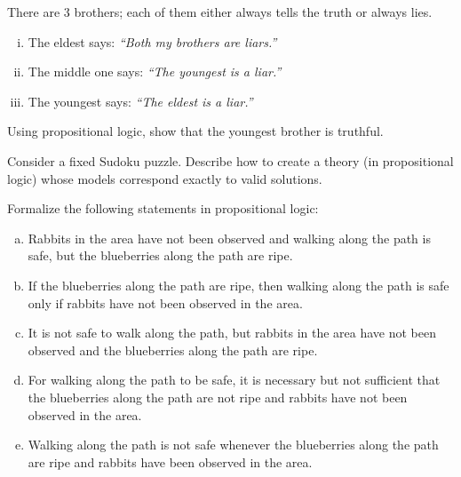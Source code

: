 \begin{problem}

    There are 3 brothers; each of them either always tells the truth or always lies.
    \begin{enumerate}[(i)]
        \item The eldest says: \emph{``Both my brothers are liars.''}
        \item The middle one says: \emph{``The youngest is a liar.''}
        \item The youngest says: \emph{``The eldest is a liar.''}
    \end{enumerate}
    Using propositional logic, show that the youngest brother is truthful.
     
\end{problem}


\begin{problem}

    Consider a fixed Sudoku puzzle. Describe how to create a theory (in propositional logic) whose models correspond exactly to valid solutions.
    
\end{problem}


\begin{problem}

    Formalize the following statements in propositional logic:
    \begin{enumerate}[(a)]\it

        \item Rabbits in the area have not been observed and walking along the path is safe, but the blueberries along the path are ripe.
        
        \item If the blueberries along the path are ripe, then walking along the path is safe only if rabbits have not been observed in the area.
        
        \item It is not safe to walk along the path, but rabbits in the area have not been observed and the blueberries along the path are ripe.
        
        \item For walking along the path to be safe, it is necessary but not sufficient that the blueberries along the path are not ripe and rabbits have not been observed in the area.
        
        \item Walking along the path is not safe whenever the blueberries along the path are ripe and rabbits have been observed in the area.
    
    \end{enumerate}
    
\end{problem}


